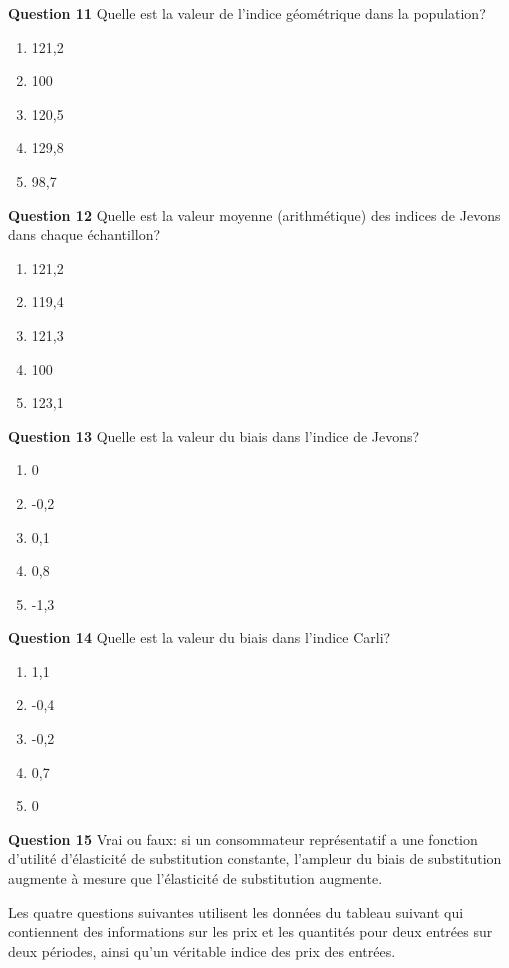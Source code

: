 \documentclass[]{article}
\begin{document}
\textbf{Question 11} Quelle est la valeur de l'indice géométrique dans la population?

\begin{enumerate}
\def\labelenumi{\alph{enumi})}
\item
  121,2
\item
  100
\item
  120,5
\item
  129,8
\item
  98,7
\end{enumerate}

\textbf{Question 12} Quelle est la valeur moyenne (arithmétique) des indices de Jevons dans chaque échantillon?

\begin{enumerate}
\def\labelenumi{\alph{enumi})}
\item
  121,2
\item
  119,4
\item
  121,3
\item
  100
\item
  123,1
\end{enumerate}

\textbf{Question 13} Quelle est la valeur du biais dans l'indice de Jevons?

\begin{enumerate}
\def\labelenumi{\alph{enumi})}
\item
  0
\item
  -0,2
\item
  0,1
\item
  0,8
\item
  -1,3
\end{enumerate}

\textbf{Question 14} Quelle est la valeur du biais dans l'indice Carli?

\begin{enumerate}
\def\labelenumi{\alph{enumi})}
\item
  1,1
\item
  -0,4
\item
  -0,2
\item
  0,7
\item
  0
\end{enumerate}

\textbf{Question 15} Vrai ou faux: si un consommateur représentatif a une fonction d'utilité d'élasticité de substitution constante, l'ampleur du biais de substitution augmente à mesure que l'élasticité de substitution augmente.

Les quatre questions suivantes utilisent les données du tableau suivant qui contiennent des informations sur les prix et les quantités pour deux entrées sur deux périodes, ainsi qu'un véritable indice des prix des entrées.
\end{document}
